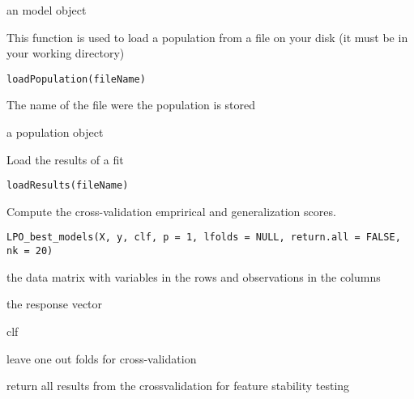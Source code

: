 \documentclass[a4paper]{book}
\begin{document}
%
\begin{Value}
an model object
\end{Value}
%
\begin{Description}
This function is used to load a population from a file on your disk (it must be in your working directory)
\end{Description}
%
\begin{Usage}
\begin{verbatim}
loadPopulation(fileName)
\end{verbatim}
\end{Usage}
%
\begin{Arguments}
\begin{ldescription}
\item[\code{fileName:}] The name of the file were the population is stored
\end{ldescription}
\end{Arguments}
%
\begin{Value}
a population object
\end{Value}
%
\begin{Description}
Load the results of a fit
\end{Description}
%
\begin{Usage}
\begin{verbatim}
loadResults(fileName)
\end{verbatim}
\end{Usage}
%
\begin{Description}
Compute the cross-validation emprirical and generalization scores.
\end{Description}
%
\begin{Usage}
\begin{verbatim}
LPO_best_models(X, y, clf, p = 1, lfolds = NULL, return.all = FALSE, nk = 20)
\end{verbatim}
\end{Usage}
%
\begin{Arguments}
\begin{ldescription}
\item[\code{X:}] the data matrix with variables in the rows and observations in the columns

\item[\code{y:}] the response vector

\item[\code{clf:}] clf

\item[\code{lfolds:}] leave one out folds for cross-validation

\item[\code{return.all:}] return all results from the crossvalidation for feature stability testing
\end{ldescription}
\end{Arguments}
\end{document}
